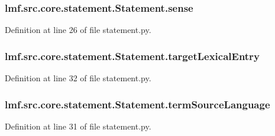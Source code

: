 \hypertarget{classlmf_1_1src_1_1core_1_1statement_1_1_statement_a1670c113f5b8143803936a3958d3f256}{
\subsubsection[{sense}]{\setlength{\rightskip}{0pt plus 5cm}lmf.\+src.\+core.\+statement.\+Statement.\+sense}}\label{classlmf_1_1src_1_1core_1_1statement_1_1_statement_a1670c113f5b8143803936a3958d3f256}


Definition at line 26 of file statement.\+py.

\hypertarget{classlmf_1_1src_1_1core_1_1statement_1_1_statement_aee57d23dce671062480f9b84ac43a2f1}{
\subsubsection[{target\+Lexical\+Entry}]{\setlength{\rightskip}{0pt plus 5cm}lmf.\+src.\+core.\+statement.\+Statement.\+target\+Lexical\+Entry}}\label{classlmf_1_1src_1_1core_1_1statement_1_1_statement_aee57d23dce671062480f9b84ac43a2f1}


Definition at line 32 of file statement.\+py.

\hypertarget{classlmf_1_1src_1_1core_1_1statement_1_1_statement_ac334fff77caf25a783e77aa55ca3128d}{
\subsubsection[{term\+Source\+Language}]{\setlength{\rightskip}{0pt plus 5cm}lmf.\+src.\+core.\+statement.\+Statement.\+term\+Source\+Language}}\label{classlmf_1_1src_1_1core_1_1statement_1_1_statement_ac334fff77caf25a783e77aa55ca3128d}


Definition at line 31 of file statement.\+py.

